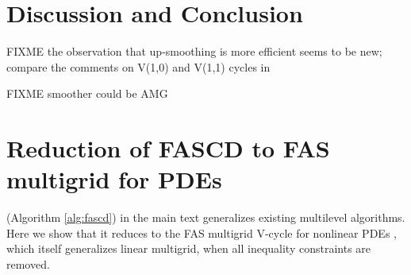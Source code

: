 \documentclass[letterpaper,final,12pt,reqno]{amsart}
\theoremstyle{cstyle}
\theoremstyle{cstyle*}
\theoremstyle{dstyle}
\numberwithin{equation}{section}
\numberwithin{figure}{section}
\numberwithin{table}{section}
\numberwithin{theorem}{section}
\begin{document}

\section{Discussion and Conclusion} \label{sec:discussion}

FIXME the observation that up-smoothing is more efficient seems to be new; compare the comments on V(1,0) and V(1,1) cycles in \cite{GraeserKornhuber2009,Tai2003}

FIXME smoother could be AMG






\appendix
\section{Reduction of FASCD to FAS multigrid for PDEs} \label{app:reductions}

 (Algorithm \ref{alg:fascd}) in the main text generalizes existing multilevel algorithms.  Here we show that it reduces to the FAS multigrid V-cycle for nonlinear PDEs \cite{Trottenbergetal2001}, which itself generalizes linear multigrid, when all inequality constraints are removed.
\end{document}

